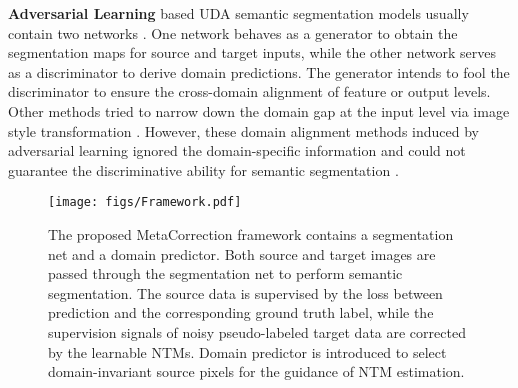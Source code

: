 \documentclass[final]{cvpr}
\begin{document}
\textbf{Adversarial Learning} based UDA semantic segmentation models usually contain two networks \cite{tsai2018learning}. One network behaves as a generator to obtain the segmentation maps for source and target inputs, while the other network serves as a discriminator to derive domain predictions. The generator intends to fool the discriminator to ensure the cross-domain alignment of feature \cite{chen2019synergistic, du2019ssf} or output \cite{kim2020learning, luo2019taking, tsai2018learning, tsai2019domain} levels. Other methods tried to narrow down the domain gap at the input level via image style transformation \cite{chen2019learning, chen2019crdoco, choi2019self, li2019bidirectional}. However, these domain alignment methods induced by adversarial learning ignored the domain-specific information and could not guarantee the discriminative ability for semantic segmentation \cite{wang2020unsupervised, zheng2020rectifying}.

\begin{figure*}
\centering
\texttt{[image: figs/Framework.pdf]}
\caption{The proposed MetaCorrection framework contains a segmentation net and a domain predictor. Both source and target images are passed through the segmentation net to perform semantic segmentation. The source data is supervised by the loss between prediction and the corresponding ground truth label, while the supervision signals of noisy pseudo-labeled target data are corrected by the learnable NTMs. Domain predictor is introduced to select domain-invariant source pixels for the guidance of NTM estimation.}
\label{fig:Framework}
\vspace{-0.3cm}
\end{figure*}
\end{document}
